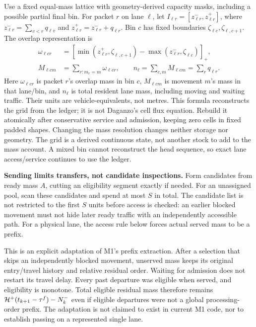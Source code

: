 \documentclass[10pt,a4paper]{article}
\newcommand{\rev}[1]{{\color{revisionred}#1}}
\begin{document}
Use a fixed equal-mass lattice with geometry-derived capacity masks,
including a possible partial final bin. For packet $r$ on lane $\ell$,
let $I_{\ell r}=[z^-_{\ell r},z^+_{\ell r}]$, where
$z^-_{\ell r}=\sum_{v<r}q_{\ell v}$ and
$z^+_{\ell r}=z^-_{\ell r}+q_{\ell r}$.
Bin $c$ has fixed boundaries $\zeta_{\ell c},\zeta_{\ell,c+1}$.
The overlap representation is
\begin{equation}
 \begin{aligned}
 \omega_{\ell cr}&=
 [\min(z^+_{\ell r},\zeta_{\ell,c+1})
           -\max(z^-_{\ell r},\zeta_{\ell c})]_+,\\
 M_{\ell cm}&=\sum_{r:m_r=m}\omega_{\ell cr},\qquad
 n_\ell=\sum_{c,m}M_{\ell cm}=\sum_rq_{\ell r}.
 \end{aligned}
 \label{eq:grid}
\end{equation}
Here $\omega_{\ell cr}$ is \rev{packet $r$'s overlap mass in bin $c$},
$M_{\ell cm}$ is \rev{movement $m$'s mass in that lane/bin}, and $n_\ell$
is \rev{total resident lane mass, including moving and waiting traffic}.
Their units are vehicle-equivalents, not metres.
This formula reconstructs the grid from the ledger; it is not Daganzo's
cell flux equation. Rebuild it atomically after conservative service and
admission, keeping zero cells in fixed padded shapes. Changing the mass
resolution changes neither storage nor geometry. The grid is a derived
continuous state, not another stock to add to the mass account. A mixed
bin cannot reconstruct the head sequence, so exact lane access/service
continues to use the ledger.
\par

\textbf{Sending limits transfers, not candidate inspections.}
Form candidates from ready mass $A$, cutting an eligibility segment
exactly if needed. For an unassigned pool, scan these candidates and
spend at most $S$ in total. The candidate list is not restricted to the first $S$ units before access
is checked: an earlier blocked movement must not hide later ready traffic
with an independently accessible path. For a physical lane, the access rule below forces
actual served mass to be a prefix.

This is an explicit adaptation of M1's prefix extraction. After a
selection that skips an independently blocked movement, unserved mass
keeps its original entry/travel history and relative residual order.
Waiting for admission does not restart its travel delay. Every past departure was eligible when served, and eligibility
is monotone. Total eligible residual mass therefore remains
${\cal H}^+(t_{k+1}-\tau^f)-N^-_k$ even if eligible departures were not
a global processing-order prefix. The adaptation is not claimed to exist
in current M1 code, nor to establish passing on a represented single lane.
\end{document}

